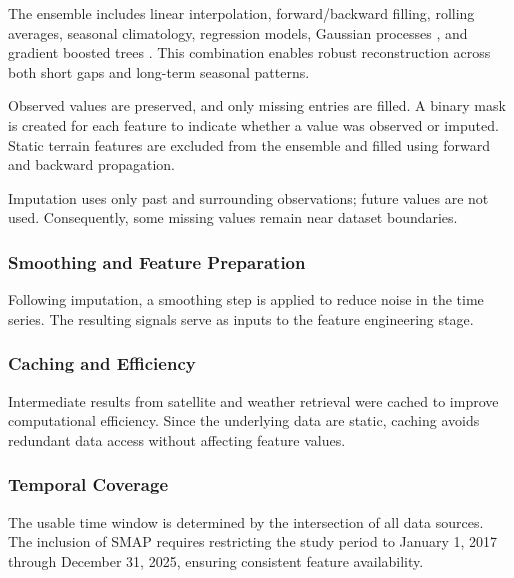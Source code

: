 The ensemble includes linear interpolation, forward/backward filling, rolling averages, seasonal climatology, regression models, Gaussian processes \cite{rasmussen2006}, and gradient boosted trees \cite{chen2016xgboost}. This combination enables robust reconstruction across both short gaps and long-term seasonal patterns.

Observed values are preserved, and only missing entries are filled. A binary mask is created for each feature to indicate whether a value was observed or imputed. Static terrain features are excluded from the ensemble and filled using forward and backward propagation.

Imputation uses only past and surrounding observations; future values are not used. Consequently, some missing values remain near dataset boundaries.

\subsubsection*{Smoothing and Feature Preparation}
Following imputation, a smoothing step is applied to reduce noise in the time series. The resulting signals serve as inputs to the feature engineering stage.

\subsubsection*{Caching and Efficiency}
Intermediate results from satellite and weather retrieval were cached to improve computational efficiency. Since the underlying data are static, caching avoids redundant data access without affecting feature values.

\subsubsection*{Temporal Coverage}
The usable time window is determined by the intersection of all data sources. The inclusion of SMAP requires restricting the study period to January 1, 2017 through December 31, 2025, ensuring consistent feature availability.
